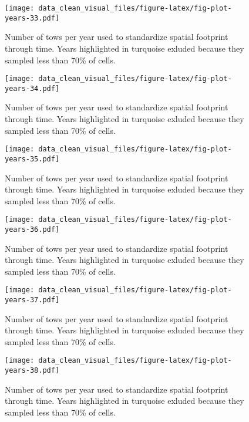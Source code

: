 \documentclass[
]{article}
\begin{document}
\begin{figure}
\centering
\texttt{[image: data\_clean\_visual\_files/figure-latex/fig-plot-years-33.pdf]}
\caption{\label{fig:fig-plot-years-33}Number of tows per year used to standardize spatial footprint through time. Years highlighted in turquoise exluded because they sampled less than 70\% of cells.}
\end{figure}

\begin{figure}
\centering
\texttt{[image: data\_clean\_visual\_files/figure-latex/fig-plot-years-34.pdf]}
\caption{\label{fig:fig-plot-years-34}Number of tows per year used to standardize spatial footprint through time. Years highlighted in turquoise exluded because they sampled less than 70\% of cells.}
\end{figure}

\begin{figure}
\centering
\texttt{[image: data\_clean\_visual\_files/figure-latex/fig-plot-years-35.pdf]}
\caption{\label{fig:fig-plot-years-35}Number of tows per year used to standardize spatial footprint through time. Years highlighted in turquoise exluded because they sampled less than 70\% of cells.}
\end{figure}

\begin{figure}
\centering
\texttt{[image: data\_clean\_visual\_files/figure-latex/fig-plot-years-36.pdf]}
\caption{\label{fig:fig-plot-years-36}Number of tows per year used to standardize spatial footprint through time. Years highlighted in turquoise exluded because they sampled less than 70\% of cells.}
\end{figure}

\begin{figure}
\centering
\texttt{[image: data\_clean\_visual\_files/figure-latex/fig-plot-years-37.pdf]}
\caption{\label{fig:fig-plot-years-37}Number of tows per year used to standardize spatial footprint through time. Years highlighted in turquoise exluded because they sampled less than 70\% of cells.}
\end{figure}

\begin{figure}
\centering
\texttt{[image: data\_clean\_visual\_files/figure-latex/fig-plot-years-38.pdf]}
\caption{\label{fig:fig-plot-years-38}Number of tows per year used to standardize spatial footprint through time. Years highlighted in turquoise exluded because they sampled less than 70\% of cells.}
\end{figure}
\end{document}
